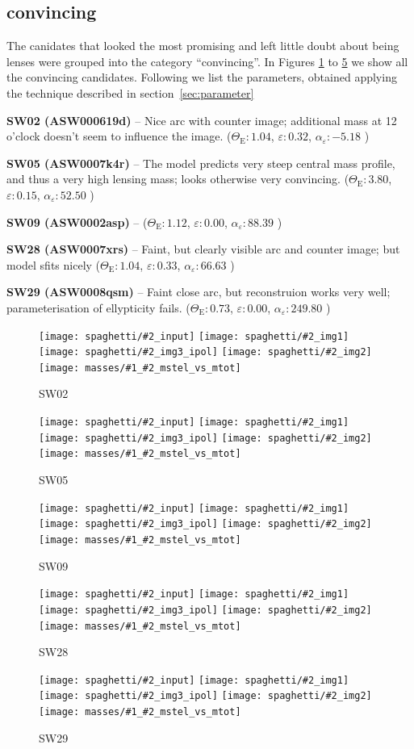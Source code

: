 \documentclass[fleqn,usenatbib]{mnras}
\newcommand{\inclfig}[2]{
  \centering
	\texttt{[image: spaghetti/\#2\_input]}%
	\texttt{[image: spaghetti/\#2\_img1]}
	\texttt{[image: spaghetti/\#2\_img3\_ipol]}%
	\texttt{[image: spaghetti/\#2\_img2]}
	\texttt{[image: masses/\#1\_\#2\_mstel\_vs\_mtot]}
}
\newcommand{\lenstitle}[1]{\noindent\textbf{#1} --}
\newcommand{\params}[3]{(\(\Theta_\text{E}:#1\), $\varepsilon:#2$, $\alpha_\varepsilon:#3$ )}
\begin{document}
\subsection{convincing}

The canidates that looked the most promising and left little doubt about being lenses were grouped into the category ``convincing''.
In Figures \ref{fig:SW02} to \ref{fig:SW29} we show all the convincing candidates.
Following we list the parameters, obtained applying the technique described in section~\ref{sec:parameter}

\lenstitle{SW02 (ASW000619d)}
Nice arc with counter image;
additional mass at 12 o'clock doesn't seem to influence the image.
\params{1.04}{0.32}{-5.18}

\lenstitle{SW05 (ASW0007k4r)}
The model predicts very steep central mass profile, and thus a very high lensing mass;
looks otherwise very convincing.
\params{3.80}{0.15}{52.50}
  
\lenstitle{SW09 (ASW0002asp)}
\params{1.12}{0.00}{88.39}
  
\lenstitle{SW28 (ASW0007xrs)}
Faint, but clearly visible arc and counter image;
but model sfits nicely
\params{1.04}{0.33}{66.63}
 
\lenstitle{SW29 (ASW0008qsm)}
Faint close arc, but reconstruion works very well;
parameterisation of ellypticity fails.
\params{0.73}{0.00}{249.80}

\begin{figure}
  \inclfig{SW02}{ASW000619d_011489}
  \caption{SW02}
  \label{fig:SW02}
\end{figure}

\begin{figure}
  \inclfig{SW05}{ASW0007k4r_AJIBCHQ6EM}
  \caption{SW05}
  \label{fig:SW05}
\end{figure}

\begin{figure}
  \inclfig{SW09}{ASW0002asp_5EKMWWVJHL}
  \caption{SW09}
  \label{fig:SW09}
\end{figure}

\begin{figure}
  \inclfig{SW28}{ASW0007xrs_JHC3J2HYV7}
  \caption{SW28}
  \label{fig:SW28}
\end{figure}

\begin{figure}
  \inclfig{SW29}{ASW0008qsm_TOFS7JNGEK}
  \caption{SW29}
  \label{fig:SW29}
\end{figure}
\end{document}
